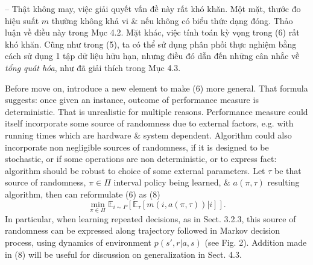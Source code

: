 \documentclass{article}
\begin{document}
\begin{itemize}
\begin{itemize}
        -- Thật không may, việc giải quyết vấn đề này rất khó khăn. Một mặt, thước đo hiệu suất $m$ thường không khả vi \& nếu không có biểu thức dạng đóng. Thảo luận về điều này trong Mục 4.2. Mặt khác, việc tính toán kỳ vọng trong (6) rất khó khăn. Cũng như trong (5), ta có thể sử dụng phân phối thực nghiệm bằng cách sử dụng 1 tập dữ liệu hữu hạn, nhưng điều đó dẫn đến những cân nhắc về {\it tổng quát hóa}, như đã giải thích trong Mục 4.3.

        Before move on, introduce a new element to make (6) more general. That formula suggests: once given an instance, outcome of performance measure is deterministic. That is unrealistic for multiple reasons. Performance measure could itself incorporate some source of randomness due to external factors, e.g. with running times which are hardware \& system dependent. Algorithm could also incorporate non negligible sources of randomness, if it is designed to be stochastic, or if some operations are non deterministic, or to express fact: algorithm should be robust to choice of some external parameters. Let $\tau$ be that source of randomness, $\pi\in\Pi$ interval policy being learned, \& $a(\pi,\tau)$ resulting algorithm, then can reformulate (6) as (8)
        \begin{equation*}
            \min_{\pi\in\Pi} \mathbb{E}_{i\sim P}[\mathbb{E}_\tau[m(i,a(\pi,\tau))|i]].
        \end{equation*}
        In particular, when learning repeated decisions, as in Sect. 3.2.3, this source of randomness can be expressed along trajectory followed in Markov decision process, using dynamics of environment $p(s',r|a,s)$ (see Fig. 2). Addition made in (8) will be useful for discussion on generalization in Sect. 4.3.


\end{itemize}
\end{itemize}
\end{document}
